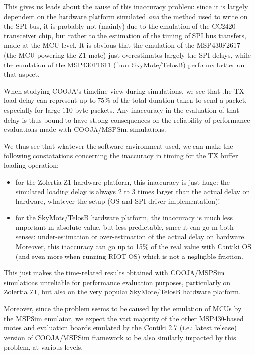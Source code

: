 \documentclass[10pt,final,journal,twocolumn]{IEEEtran}
\begin{document}
This gives us leads about the cause of this inaccuracy problem: since it
is largely dependent on the hardware platform simulated \emph{and} the method
used to write on the SPI bus, it is probably not (mainly) due to the
emulation of the CC2420 transceiver chip, but rather to the estimation of
the timing of SPI bus transfers, made at the MCU level. It is obvious that
the emulation of the MSP430F2617 (the MCU powering the Z1 mote) just
overestimates largely the SPI delays, while the emulation of the MSP430F1611
(from SkyMote/TelosB) performs better on that aspect.

\medskip

When studying COOJA's timeline view during simulations, we see that the
TX load delay can represent up to 75\% of the total duration taken to
send a packet, especially for large 110-byte packets. Any inaccuracy
in the evaluation of that delay is thus bound to have strong consequences
on the reliability of performance evaluations made with COOJA/MSPSim
simulations.


\medskip

We thus see that whatever the software environment used, we can make the
following constatations concerning the inaccuracy in timing for the TX buffer
loading operation:
\begin{itemize}
\item for the Zolertia Z1 hardware platform, this inaccuracy is just huge:
the simulated loading delay is always 2 to 3 times larger than the actual
delay on hardware, whatever the setup (OS and SPI driver implementation)!
\item for the SkyMote/TelosB hardware platform, the inaccuracy is much less
important in absolute value, but less predictable, since it can go in both
senses: under-estimation or over-estimation of the actual delay on hardware.
Moreover, this inaccuracy can go up to 15\% of the real value with Contiki
OS (and even more when running RIOT OS) which is not a negligible fraction.
\end{itemize}
This just makes the time-related results obtained with COOJA/MSPSim
simulations unreliable for performance evaluation purposes, particularly
on Zolertia Z1, but also on the very popular SkyMote/TelosB hardware platform.

Moreover, since the problem seems to be caused by the emulation of
MCUs by the MSPSim emulator, we expect the vast majority of the other
MSP430-based motes and evaluation boards emulated by the Contiki 2.7
(i.e.: latest release) version of COOJA/MSPSim framework to be also similarly
impacted by this problem, at various levels.
\end{document}
